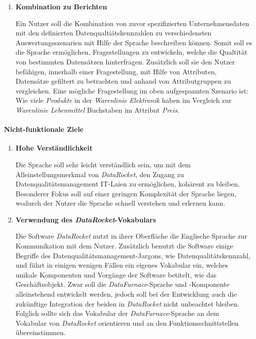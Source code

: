 \documentclass[
  language=german, %
  type=bachelor%
]{isthesis}
\begin{document}
\begin{content}
\begin{enumerate}
      \item \textbf{Kombination zu Berichten}

        Ein Nutzer soll die Kombination von zuvor spezifizierten
        Unternehmensdaten mit den definierten Datenqualtiätskennzahlen zu
        verschiedensten Auswertungsszenarien mit Hilfe der Sprache beschreiben
        können. Somit soll es die Sprache ermöglichen, Fragestellungen zu
        entwickeln, welche die Qualtität von bestimmten Datensätzen hinterfragen.
        Zusätzlich soll sie den Nutzer befähigen, innerhalb einer
        Fragestellung, mit Hilfe von Attributen, Datensätze gefiltert zu
        betrachten und anhand von Attributgruppen zu vergleichen. Eine mögliche
        Fragestellung im oben aufgespannten Szenario ist: Wie viele
        \textit{Produkte} in der \textit{Warenlinie} \textit{Elektronik} haben
        im Vergleich zur \textit{Warenlinie} \textit{Lebenmittel} Buchstaben im
        Attribut \textit{Preis}.
    \end{enumerate}

  \paragraph{Nicht-funktionale Ziele}
    \begin{enumerate}
      \item \textbf{Hohe Verständlichkeit}

				Die Sprache soll sehr leicht verständlich sein, um mit dem
				Alleinstellungsmerkmal von \textit{DataRocket}, den Zugang zu
				Datenqualitätsmanagement IT-Laien zu ermöglichen, kohärent zu bleiben.
				Besonderer Fokus soll auf einer geringen Komplexität der Sprache
				liegen, wodurch der Nutzer die Sprache schnell verstehen und erlernen
				kann.

      \item \textbf{Verwendung des \textit{DataRocket}-Vokabulars}

				Die Software \textit{DataRocket} nutzt in ihrer Oberfläche die
				Englische Sprache zur Kommunikation mit dem Nutzer. Zusätzlich benutzt
				die Software einige Begriffe des Datenqualitätsmanagement-Jargons, wie
				\zB{} Datenqualitätskennzahl, und führt in einigen wenigen Fällen ein
				eigenes Vokabular ein, welches unikale Komponenten und Vorgänge der
				Software betitelt, wie \zB{} das Geschäftsobjekt. Zwar soll die
				\textit{DataFurnace}-Sprache und -Komponente alleinstehend entwickelt
				werden, jedoch soll bei der Entwicklung auch die zukünftige Integration
				der beiden in \textit{DataRocket} nicht unbeachtet bleiben. Folglich
				sollte sich das Vokabular der \textit{DataFurnace}-Sprache an dem
				Vokabular von \textit{DataRocket} orientieren und an den
				Funktionsschnittstellen übereinstimmen.


\end{enumerate}
\end{content}
\end{document}
